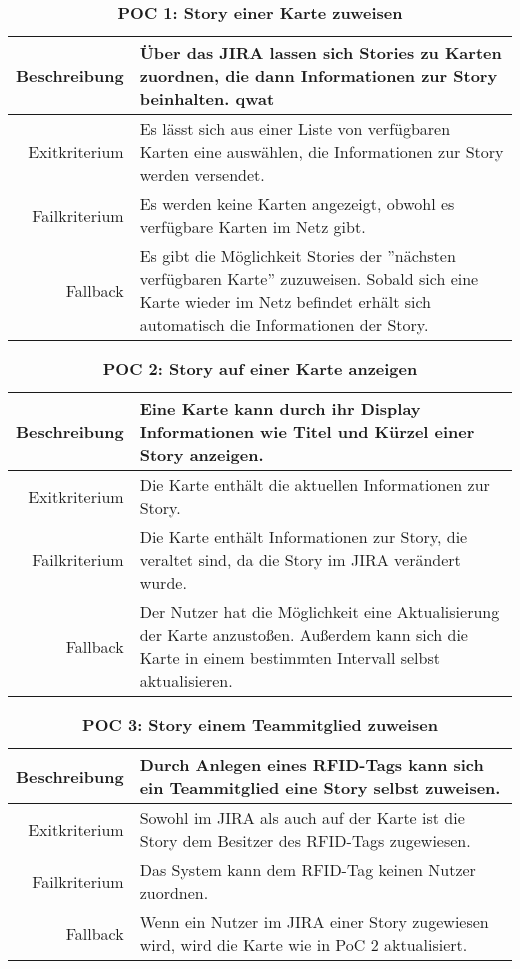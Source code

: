 \documentclass[12pt,titlepage]{scrartcl}
\begin{document}
\begin{table}[H]
\centering
\caption{\textbf{POC 1: Story einer Karte zuweisen}}
\label{poc1}
\begin{tabularx}{\linewidth}{|r|X|}
\hline
Beschreibung  & Über das JIRA lassen sich Stories zu Karten zuordnen, die dann Informationen zur Story beinhalten. qwat                                  \\ \hline
Exitkriterium & Es lässt sich aus einer Liste von verfügbaren Karten eine auswählen, die Informationen zur Story werden versendet. \\ \hline
Failkriterium & Es werden keine Karten angezeigt, obwohl es verfügbare Karten im Netz gibt. \\ \hline
Fallback      & Es gibt die Möglichkeit Stories der ''nächsten verfügbaren Karte'' zuzuweisen. Sobald sich eine Karte wieder im Netz befindet erhält sich automatisch die Informationen der Story. \\ \hline
\end{tabularx}
\end{table}

\begin{table}[H]
\centering
\caption{\textbf{POC 2: Story auf einer Karte anzeigen}}
\label{poc2}
\begin{tabularx}{\linewidth}{|r|X|}
\hline
Beschreibung  & Eine Karte kann durch ihr Display Informationen wie Titel und Kürzel einer Story anzeigen. \\ \hline
Exitkriterium & Die Karte enthält die aktuellen Informationen zur Story. \\ \hline
Failkriterium & Die Karte enthält Informationen zur Story, die veraltet sind, da die Story im JIRA verändert wurde.
 \\ \hline
Fallback      & Der Nutzer hat die Möglichkeit eine Aktualisierung der Karte anzustoßen. Außerdem kann sich die Karte in einem bestimmten Intervall selbst aktualisieren.
 \\ \hline
\end{tabularx}
\end{table}

\begin{table}[H]
\centering
\caption{\textbf{POC 3: Story einem Teammitglied zuweisen}}
\label{poc3}
\begin{tabularx}{\linewidth}{|r|X|}
\hline
Beschreibung  & Durch Anlegen eines RFID-Tags kann sich ein Teammitglied eine Story selbst zuweisen.  \\ \hline
Exitkriterium & Sowohl im JIRA als auch auf der Karte ist die Story dem Besitzer des RFID-Tags zugewiesen. \\ \hline
Failkriterium & Das System kann dem RFID-Tag keinen Nutzer zuordnen.
 \\ \hline
Fallback      & Wenn ein Nutzer im JIRA einer Story zugewiesen wird, wird die Karte wie in PoC 2 aktualisiert. 
 \\ \hline
\end{tabularx}
\end{table}
\end{document}

